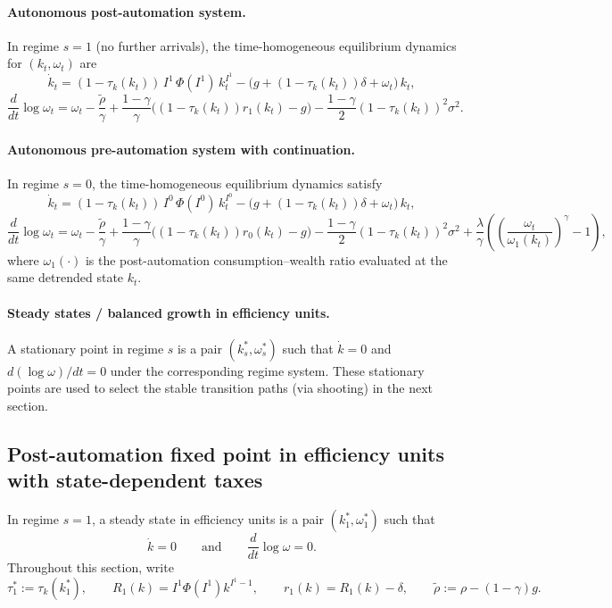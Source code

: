 \documentclass{article}
\begin{document}
\paragraph{Autonomous post-automation system.}
In regime $s=1$ (no further arrivals), the time-homogeneous equilibrium dynamics for $(k_t,\omega_t)$ are
$$
\dot k_t
=(1-\tau_k(k_t))\,I^1\,\Phi(I^1)\,k_t^{I^1}
-\Big(g+(1-\tau_k(k_t))\delta+\omega_t\Big)\,k_t,
$$
$$
\frac{d}{dt}\log \omega_t
=
\omega_t
-\frac{\tilde\rho}{\gamma}
+\frac{1-\gamma}{\gamma}\Big((1-\tau_k(k_t))r_1(k_t)-g\Big)
-\frac{1-\gamma}{2}(1-\tau_k(k_t))^2\sigma^2.
$$

\paragraph{Autonomous pre-automation system with continuation.}
In regime $s=0$, the time-homogeneous equilibrium dynamics satisfy
$$
\dot k_t
=(1-\tau_k(k_t))\,I^0\,\Phi(I^0)\,k_t^{I^0}
-\Big(g+(1-\tau_k(k_t))\delta+\omega_t\Big)\,k_t,
$$
$$
\frac{d}{dt}\log \omega_t
=
\omega_t
-\frac{\tilde\rho}{\gamma}
+\frac{1-\gamma}{\gamma}\Big((1-\tau_k(k_t))r_0(k_t)-g\Big)
-\frac{1-\gamma}{2}(1-\tau_k(k_t))^2\sigma^2
+\frac{\lambda}{\gamma}\left(
\left(\frac{\omega_t}{\omega_1(k_t)}\right)^{\gamma}-1
\right),
$$
where $\omega_1(\cdot)$ is the post-automation consumption--wealth ratio evaluated at the same detrended state $k_t$.

\paragraph{Steady states / balanced growth in efficiency units.}
A stationary point in regime $s$ is a pair $(k^\ast_s,\omega^\ast_s)$ such that $\dot k=0$ and $d(\log\omega)/dt=0$ under the corresponding regime system. These stationary points are used to select the stable transition paths (via shooting) in the next section.


\subsection{Post-automation fixed point in efficiency units with state-dependent taxes}
\label{sec:post_fixed_point}

In regime $s=1$, a steady state in efficiency units is a pair $(k_1^\ast,\omega_1^\ast)$ such that
$$
\dot k = 0
\qquad\text{and}\qquad
\frac{d}{dt}\log \omega = 0.
$$
Throughout this section, write
$$
\tau_1^\ast := \tau_k(k_1^\ast),
\qquad
R_1(k)=I^1\Phi(I^1)k^{I^1-1},
\qquad
r_1(k)=R_1(k)-\delta,
\qquad
\tilde\rho := \rho-(1-\gamma)g.
$$
\end{document}
